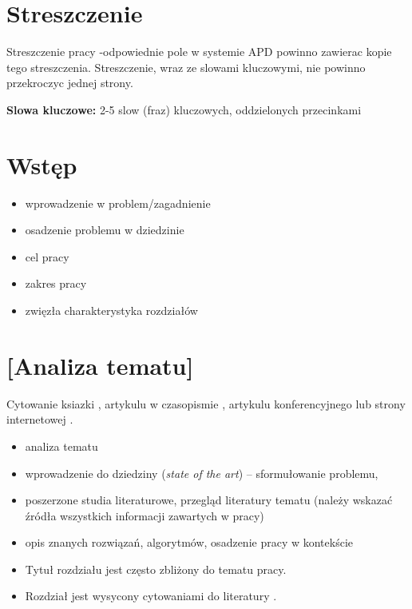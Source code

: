 \documentclass[a4paper,twoside,12pt]{book}
\newcommand{\obcy}[1]{\emph{#1}}
\newcommand{\ang}[1]{{\selectlanguage{british}\obcy{#1}}}
\newcounter{stronyPozaNumeracja}
\begin{document}
\pagestyle{tylkoNumeryStron}
\tableofcontents

\setcounter{stronyPozaNumeracja}{\value{page}}
\mainmatter


\pagestyle{empty}

\chapter*{Streszczenie}

Streszczenie pracy -odpowiednie pole w systemie APD powinno zawierac kopie tego streszczenia. Streszczenie, wraz ze slowami kluczowymi, nie powinno przekroczyc jednej strony.

{\bf Slowa kluczowe:} 2-5 slow (fraz) kluczowych, oddzielonych przecinkami


\cleardoublepage

\pagestyle{NumeryStronNazwyRozdzialow}


\chapter{Wstęp}

\begin{itemize}
\item wprowadzenie w problem/zagadnienie 
\item osadzenie problemu w dziedzinie 
\item cel pracy 
\item zakres pracy 
\item zwięzła charakterystyka rozdziałów 
\end{itemize}


\chapter{[Analiza tematu]}

Cytowanie ksiazki \cite{bib:ksiazka}, artykulu w czasopismie \cite{bib:artykul}, artykulu konferencyjnego \cite{bib:konferencja} lub strony internetowej \cite{bib:url}.

\begin{itemize}
\item analiza tematu
\item wprowadzenie do dziedziny (\ang{state of the art}) – sformułowanie problemu, 
\item poszerzone studia literaturowe, przegląd literatury tematu (należy wskazać źródła wszystkich informacji zawartych w pracy)
\item opis znanych rozwiązań, algorytmów, osadzenie pracy w kontekście
\item Tytuł rozdziału jest często zbliżony do tematu pracy. 
\item Rozdział jest wysycony cytowaniami do literatury \cite{bib:artykul,bib:ksiazka,bib:konferencja}.
\end{itemize}
\end{document}
